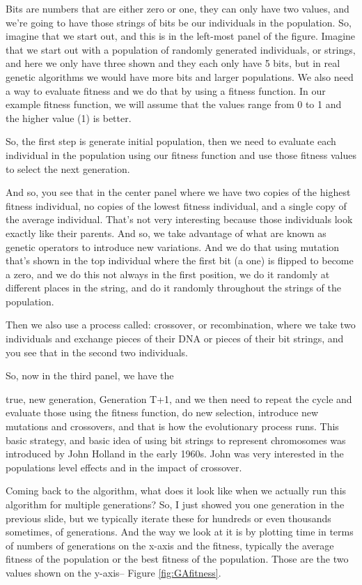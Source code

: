 \documentclass[]{article}
\begin{document}
Bits are numbers that are either
zero or one, they can only have two values,
and we're going to have those strings of bits
be our individuals in the population.
So, imagine that we start out, and this is
in the left-most panel of the figure.
Imagine that we start out with a population
of randomly generated individuals, or strings,
and here we only have three shown and they
each only have 5 bits, but in real genetic
algorithms we would have more bits and
larger populations.
We also need a way to evaluate fitness
and we do that by using a fitness function.
In our example fitness function, we will assume
that the values range from 0 to 1 and the
higher value (1) is better.

So, the first step is generate initial population,
then we need to evaluate each individual
in the population using our fitness function
and use those fitness values to select
the next generation.

And so, you see that in the center panel
where we have two copies of the highest
fitness individual, no copies of the lowest
fitness individual, and a single copy
of the average individual.
That's not very interesting because
those individuals look exactly like their parents.
And so, we take advantage of what are known as
genetic operators to introduce new variations.
And we do that using mutation that's shown
in the top individual where the first bit (a one)
is flipped to become a zero, and we do this
not always in the first position, we do it
randomly at different places in the string,
and do it randomly throughout the strings
of the population.

Then we also use a process called:
crossover, or recombination, where we take
two individuals and exchange pieces of their
DNA or pieces of their bit strings, and
you see that in the second two individuals.

So, now in the third panel, we have the

true, new generation, Generation T+1, and
we then need to repeat the cycle
and evaluate those using the fitness function,
do new selection, introduce new mutations
and crossovers, and that is how
the evolutionary process runs.
This basic strategy, and basic idea of using
bit strings to represent chromosomes was
introduced by John Holland in the early 1960s.
John was very interested in the
populations level effects and in the
impact of crossover.

Coming back to the algorithm,
what does it look like when we actually
run this algorithm for multiple generations?
So, I just showed you one generation in the previous slide,
but we typically iterate these for hundreds
or even thousands sometimes, of generations.
And the way we look at it is by plotting time
in terms of numbers of generations on the x-axis
and the fitness, typically the average fitness
of the population or the best fitness of
the population. Those are the two values
shown  on the y-axis-- Figure \ref{fig:GAfitness}.
\end{document}
